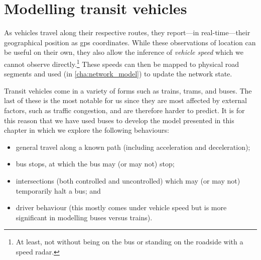 
\chapter{Modelling transit vehicles}
\label{cha:vehicle_model}

As vehicles travel along their respective routes, they report---in real-time---their geo\-graphical position as \gls{gps} coordinates. While these observations of location can be useful on their own, they also allow the inference of \emph{vehicle speed} which we cannot observe directly.\footnote{At least, not without being on the bus or standing on the roadside with a speed radar.} These speeds can then be mapped to physical road segments and used (in \cref{cha:network_model}) to update the network state.

Transit vehicles come in a variety of forms such as trains, trams, and buses. The last of these is the most notable for us since they are most affected by external factors, such as traffic congestion, and are therefore harder to predict. It is for this reason that we have used buses to develop the model presented in this chapter in which we explore the following behaviours:
\begin{itemize}
\item general travel along a known path (including acceleration and deceleration);
\item bus stops, at which the bus may (or may not) stop;
\item intersections (both controlled and uncontrolled) which may (or may not) temporarily halt a bus; and
\item driver behaviour (this mostly comes under vehicle speed but is more significant in modelling buses versus trains).
\end{itemize}


